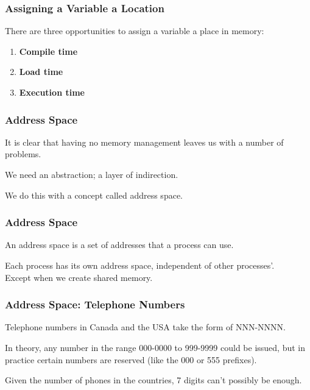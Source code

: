 \begin{frame}
\frametitle{Assigning a Variable a Location}

There are three opportunities to assign a variable a place in memory:

\begin{enumerate}
	\item \textbf{Compile time}
	\item \textbf{Load time}
	\item \textbf{Execution time}
\end{enumerate}


\end{frame}

\begin{frame}
\frametitle{Address Space}

It is clear that having no memory management leaves us with a number of problems. 

We need an abstraction; a layer of indirection. 

We do this with a concept called \alert{address space}. 


\end{frame}

\begin{frame}
\frametitle{Address Space}

An address space is a set of addresses that a process can use.

Each process has its own address space, independent of other processes'.\\
\quad Except when we create shared memory.

\end{frame}



\begin{frame}
\frametitle{Address Space: Telephone Numbers}
Telephone numbers in Canada and the USA take the form of NNN-NNNN.

In theory, any number in the range 000-0000 to 999-9999 could be issued, but in practice certain numbers are reserved (like the 000 or 555 prefixes).

Given the number of phones in the countries, 7 digits can't possibly be enough.

\end{frame}

